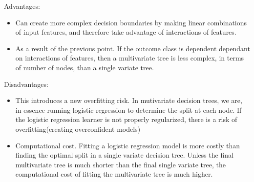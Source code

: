 \begin{answer}
\newpage
Advantages:
\begin{itemize}
    \item Can create more complex decision boundaries by making linear combinations of input features, and therefore take advantage of interactions of features.
    \item As a result of the previous point. If the outcome class is dependent dependant on interactions of features, then a multivariate tree is less complex, in terms of number of nodes, than a single variate tree. 
\end{itemize}
Disadvantages:
\begin{itemize}
    \item This introduces a new overfitting risk. In mutivariate decision trees, we are, in essence running logistic regression to determine the split at each node. If the logistic regression learner is not properly regularized, there is a risk of overfitting(creating overconfident models)
    \item Computational cost. Fitting a logistic regression model is more costly than finding the optimal split in a single variate decision tree. Unless the final multivariate tree is much shorter than the final single variate tree, the computational cost of fitting the multivariate tree is much higher.
\end{itemize}
\end{answer}